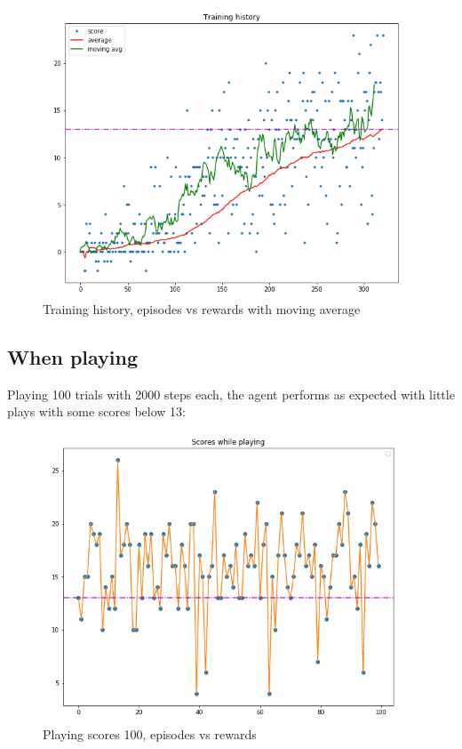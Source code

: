 \documentclass{article}
\begin{document}
\begin{figure}[!htbp]
\centering
\includegraphics[scale=0.3]{training2}
\caption{Training history, episodes vs rewards with moving average}
\label{fig:traiming2}
\end{figure}

\subsection{When playing}
Playing 100 trials with 2000 steps each, the agent performs as expected with little plays with some scores below 13:
\begin{figure}[!htbp]
\centering
\includegraphics[scale=0.3]{play_scores}
\caption{Playing scores 100, episodes vs rewards}
\label{fig:play_scores}
\end{figure}
\end{document}
